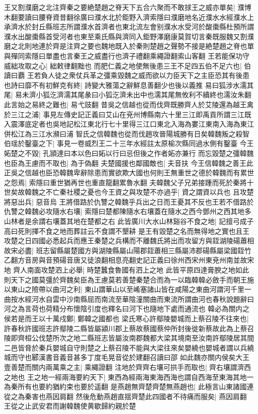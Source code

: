 王又割濮磨之北注齊秦之要絶楚趙之脊天下五合六聚而不敢捄王之威亦單矣|{
	濮博木翻要讀曰腰脊資昔翻徐廣曰濮水北於鉅野入濟索隱曰濮磨地名近濮水水經濮水上承濟水於封丘縣班志所謂濮水首濟者也東北流左會别濮水水受河於酸棗縣杜預所謂濮水出酸棗縣首受河者也東至乘氏縣與濟同入鉅野澤磨康莫賀切言秦既服魏又割濮磨之北則地連於齊是注齊之要也魏地既入於秦則楚趙之聲勢不接是絶楚趙之脊也單與殫同索隱曰單盡也言秦王之威盡行也濟子禮翻乘繩證翻索山客翻}
王若能保功守威絀攻取之心|{
	絀敕律翻黜也}
而肥仁義之地使無後患三王不足四五伯不足六也|{
	伯讀曰覇}
王若負人徒之衆仗兵革之彊乘毀魏之威而欲以力臣天下之主臣恐其有後患也詩曰靡不有初鮮克有終|{
	詩變大雅蕩之辭鮮息善翻少也後以義推}
易曰狐涉水濡其尾|{
	易未濟小狐汔濟濡其尾彖曰小狐汔濟未出中也濡其尾無攸利不續終也濡汝朱翻}
此言始之易終之難也|{
	易弋豉翻}
昔吳之信越也從而伐齊既勝齊人於艾陵還為越王禽於三江之浦|{
	事見左傳史記正義曰艾山在兗州博縣南六十里三江即禹貢所謂三江既入震澤底定者也吳地記松江東北行七十里得三江口東北入海為婁江東南入海為東江併松江為三江水瀕曰浦}
智氏之信韓魏也從而伐趙攻晉陽城勝有日矣韓魏叛之殺智伯瑶於鑿臺之下|{
	事見一卷威烈王二十三年水經註太原榆次縣同過水側有鑿臺}
今王妬楚之不毀|{
	孔頴達曰本以色曰妬以行曰忌但後之作者妬亦兼行}
而忘毀楚之彊韓魏也臣為王慮而不取也|{
	為于偽翻}
夫楚國援也鄰國敵也|{
	夫音扶}
今王信韓魏之善王此正吳之信越也臣恐韓魏卑辭除患而實欲欺大國也何則王無重世之德於韓魏而有累世之怨焉|{
	索隱曰重世猶再世也重直龍翻累魯水翻}
夫韓魏父子兄弟接踵而死於秦將十世矣故韓魏之不亡秦社稷之憂也今王資之與攻楚不亦過乎|{
	資之謂資以兵也}
且攻楚將惡出兵|{
	惡音烏}
王將借路於仇讐之韓魏乎兵出之日而王憂其不反也王若不借路於仇讐之韓魏必攻隨水右壤|{
	索隱曰楚都陳隨水右壤蓋在隨水之西今鄧州之西其地多山林者是余謂右壤蓋其地在楚都之右}
此皆廣川大水山林谿谷不食之地|{
	記擅弓成子高曰死則擇不食之地而葬註云不食謂不墾耕}
是王有毀楚之名而無得地之實也且王攻楚之日四國必悉起兵而應王秦楚之兵構而不離魏氏將出而攻留方與銍湖陵碭蕭相故宋必盡|{
	班志留縣屬楚國方與湖陵縣屬山陽郡銍蕭相三縣屬沛郡碭縣屬梁國銍竹乙翻方音房與音預碭音唐又徒浪翻相息亮翻史記正義曰徐州西宋州東兗州南並故宋地}
齊人南面攻楚泗上必舉|{
	時楚蠶食魯國有泗上之地}
此皆平原四達膏腴之地如此則天下之國莫彊於齊魏矣臣為王慮莫若善楚秦楚合而為一以臨韓韓必斂手而朝王施以東山之險帶以曲河之利|{
	東山謂華山以至崤塞諸山皆在咸陽之東曲河謂河千里一曲按水經河水自雲中沙南縣屈而南流至華陰潼關曲而東流所謂曲河也春秋說題辭曰河之為言荷也荷精分布懷陰引度也釋名曰河下也隨地下處而通流也}
韓必為關内之侯若是而王以十萬戍鄭|{
	鄭韓之國都也}
梁氏寒心許鄢陵嬰城而上蔡召陵不往來也|{
	許春秋許國班志許鄢陵二縣皆屬潁川郡上蔡故蔡國蔡仲所封後徙新蔡故此為上蔡召陵即齊桓公伐楚所次之地二縣班志皆屬汝南郡魏都大梁其境南至汝南許鄢陵居其間二邑皆脅於秦兵嬰城自守則楚之上蔡召陵不能與大梁往來矣嬰繞也嬰城者謂以兵繞城而守也郾漢書音義音甚多丁度毛晃音從於建翻召讀曰邵}
如此魏亦關内侯矣大王壹善楚而關内兩萬乘之主|{
	乘繩證翻}
注地於齊齊右壤可拱手而取也|{
	齊右壤謂濟西之地也}
王之地一經兩海要約天下|{
	東西為經兩海東海西海也謂自西海至東海其地一為秦所有也要約猶約束也要於遥翻}
是燕趙無齊楚齊楚無燕趙也|{
	此極言山東諸國連從之為秦害也燕因肩翻}
然後危動燕趙直揺齊楚此四國者不待痛而服矣|{
	燕因肩翻}
王從之止武安君而謝韓魏使黄歇歸約親於楚

